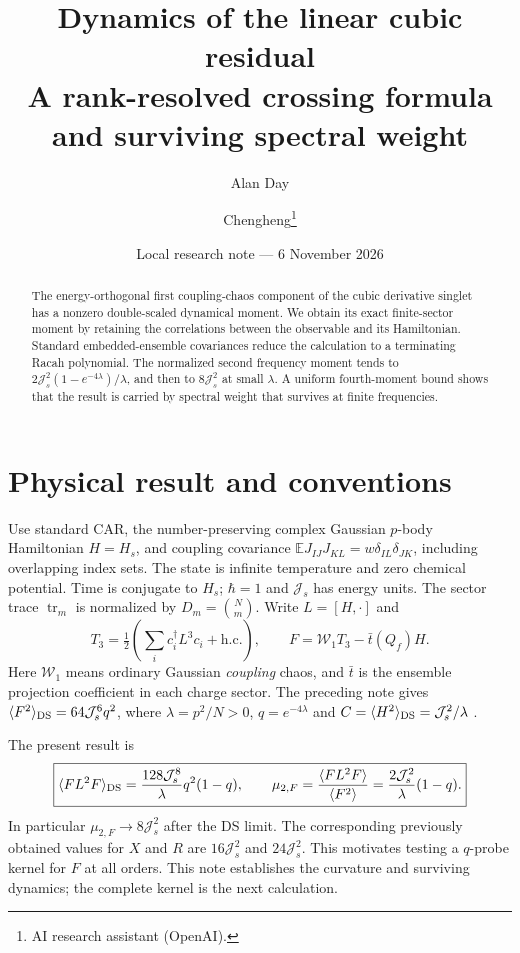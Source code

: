 \documentclass[11pt,a4paper]{article}
\title{Dynamics of the linear cubic residual\\A rank-resolved crossing formula and surviving spectral weight}
\author{Alan Day \and Chengheng\thanks{AI research assistant (OpenAI).}}
\date{Local research note --- 6 November 2026}
\newcommand{\Js}{\mathcal J_s}
\newcommand{\tr}{\operatorname{tr}}
\newcommand{\E}{\mathbb E}
\newcommand{\W}{\mathcal W}
\newcommand{\av}[1]{\langle #1\rangle}
\begin{document}
\maketitle
\begin{abstract}
The energy-orthogonal first coupling-chaos component of the cubic
derivative singlet has a nonzero double-scaled dynamical moment.
We obtain its exact finite-sector moment by retaining the correlations
between the observable and its Hamiltonian. Standard embedded-ensemble
covariances reduce the calculation to a terminating Racah polynomial.
The normalized second frequency moment tends to
$2\Js^2(1-e^{-4\lambda})/\lambda$, and then to $8\Js^2$ at small
$\lambda$. A uniform fourth-moment bound shows that the result is
carried by spectral weight that survives at finite frequencies.
\end{abstract}

\section{Physical result and conventions}
Use standard CAR, the number-preserving complex Gaussian $p$-body
Hamiltonian $H=H_s$, and coupling covariance
$\E J_{IJ}J_{KL}=w\delta_{IL}\delta_{JK}$, including overlapping
index sets. The state is infinite temperature and zero chemical
potential. Time is conjugate to $H_s$; $\hbar=1$ and $\Js$ has energy
units. The sector trace $\tr_m$ is normalized by $D_m=\binom Nm$.
Write $L=[H,\cdot]$ and
\[
 T_3=\tfrac12\left(\sum_i c_i^\dagger L^3c_i+\mathrm{h.c.}\right),
 \qquad F=\W_1 T_3-\bar t(Q_f)H.
\]
Here $\W_1$ means ordinary Gaussian \emph{coupling} chaos, and $\bar t$
is the ensemble projection coefficient in each charge sector.
The preceding note gives $\av{F^2}_{\rm DS}=64\Js^6q^2$,
where $\lambda=p^2/N>0$, $q=e^{-4\lambda}$ and
$C=\av{H^2}_{\rm DS}=\Js^2/\lambda$ \cite{previous}.

The present result is
\begin{equation}
 \boxed{\av{FL^2F}_{\rm DS}
 =\frac{128\Js^8}{\lambda}q^2(1-q),\qquad
 \mu_{2,F}=\frac{\av{FL^2F}}{\av{F^2}}
 =\frac{2\Js^2}{\lambda}(1-q).}                 \label{main}
\end{equation}
In particular $\mu_{2,F}\to8\Js^2$ after the DS limit.
The corresponding previously obtained values for $X$ and $R$ are
$16\Js^2$ and $24\Js^2$. This motivates testing a $q$-probe kernel
for $F$ at all orders. This note establishes the curvature and
surviving dynamics; the complete kernel is the next calculation.
\end{document}
